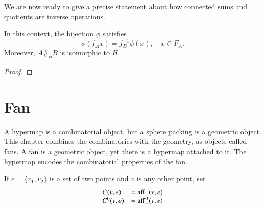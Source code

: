 We are now ready to give a precise statement about how connected sums and quotients are inverse operations.

\begin{lemma}
In this context, the bijection $\phi$ satisfies 
   $$\phi(f_A x) = f_B^{-1} \phi(x),\quad x\in F_A.$$
Moreover, $A\#_\phi B$ is isomorphic to $H$.
\end{lemma}

\begin{proof}
\end{proof}






\chapter{Fan}

A hypermap is a combinatorial object, but a sphere packing
is a geometric object.  This chapter combines the combinatorics
with the geometry, as objects called fans.  A fan is a geometric
object, yet there is a hypermap attached to it.
The hypermap encodes the combinatorial properties of the fan.



If $e=\{v_1,v_2\}$ is a set of two points and $v$ is any other point,
set
  $$
  \begin{array}{lll}
  C(v,e) &= {\operatorname{aff}}_+(v,e)\\
  C^0(v,e) &= {\operatorname{aff}}^0_+(v,e)\\
  \end{array}
  $$

